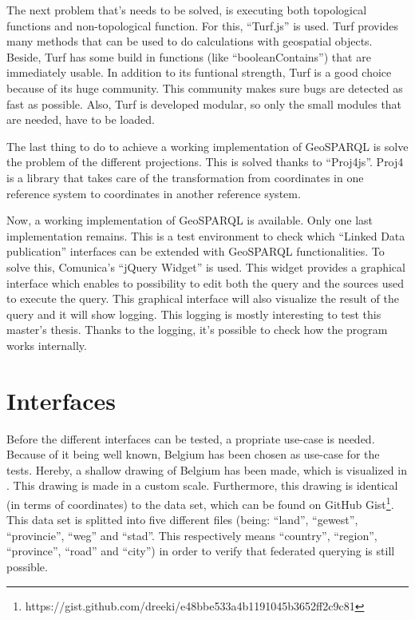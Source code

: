 \documentclass[twocolumn]{phdsymp} %
\begin{document}
The next problem that's needs to be solved, is executing both topological functions and non-topological function. For this, ``Turf.js'' is used. Turf provides many methods that can be used to do calculations with geospatial objects. Beside, Turf has some build in functions (like ``booleanContains'') that are immediately usable. In addition to its funtional strength, Turf is a good choice because of its huge community. This community makes sure bugs are detected as fast as possible. Also, Turf is developed modular, so only the small modules that are needed, have to be loaded.

The last thing to do to achieve a working implementation of GeoSPARQL is solve the problem of the different projections. This is solved thanks to ``Proj4js''. Proj4 is a library that takes care of the transformation from coordinates in one reference system to coordinates in another reference system.

Now, a working implementation of GeoSPARQL is available. Only one last implementation remains. This is a test environment to check which ``Linked Data publication'' interfaces can be extended with GeoSPARQL functionalities. To solve this, Comunica's ``jQuery Widget'' is used. This widget provides a graphical interface which enables to possibility to edit both the query and the sources used to execute the query. This graphical interface will also visualize the result of the query and it will show logging. This logging is mostly interesting to test this master's thesis. Thanks to the logging, it's possible to check how the program works internally. 
 
\section{Interfaces}
Before the different interfaces can be tested, a propriate use-case is needed. Because of it being well known, Belgium has been chosen as use-case for the tests. Hereby, a shallow drawing of Belgium has been made, which is visualized in . This drawing is made in a custom scale. Furthermore, this drawing is identical (in terms of coordinates) to the data set, which can be found on GitHub Gist\footnote{https://gist.github.com/dreeki/e48bbe533a4b1191045b3652ff2c9c81}. This data set is splitted into five different files (being: ``land'', ``gewest'', ``provincie'', ``weg'' and ``stad''. This respectively means ``country'', ``region'', ``province'', ``road'' and ``city'') in order to verify that federated querying is still possible.
\end{document}
